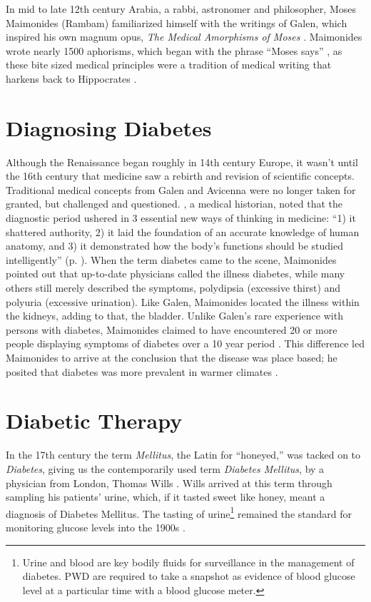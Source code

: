 \documentclass[12pt]{article}
\begin{document}
In mid to late 12th century Arabia, a rabbi, astronomer and philosopher, Moses Maimonides (Rambam) familiarized himself with the writings of Galen, which inspired his own magnum opus, \textit{The Medical Amorphisms of Moses} \citep{maimonides_1989_medical}. Maimonides wrote nearly 1500 aphorisms, which began with the phrase ``Moses says'' \citep{maimonides_1989_medical}, as these bite sized medical principles were a tradition of medical writing that harkens back to Hippocrates \citep{sanders_2001_philatelic}.

\section{Diagnosing Diabetes} 

Although the Renaissance began roughly in 14th century Europe, it wasn't until the 16th century that medicine saw a rebirth and revision of scientific concepts. Traditional medical concepts from Galen and Avicenna were no longer taken for granted, but challenged and questioned. \citet{osler_1921_evolution}, a medical historian, noted that the diagnostic period ushered in 3 essential new ways of thinking in medicine: ``1) it shattered authority, 2) it laid the foundation of an accurate knowledge of human anatomy, and 3) it demonstrated how the body's functions should be studied intelligently'' (p.  ). 
 When the term diabetes came to the scene, Maimonides pointed out that up-to-date physicians called the illness diabetes, while many others still merely described the symptoms, polydipsia (excessive thirst) and polyuria (excessive urination). Like Galen, Maimonides located the illness within the kidneys, adding to that, the bladder.  Unlike Galen's rare experience with persons with diabetes, Maimonides claimed to have encountered 20 or more people displaying symptoms of diabetes over a 10 year period \citep{maimonides_1989_medical}. This difference led Maimonides to arrive at the conclusion that the disease was place based; he posited that diabetes was more prevalent in warmer climates \citep{maimonides_1989_medical}.

\section{Diabetic Therapy}
In the 17th century the term \textit{Mellitus}, the Latin for ``honeyed,'' was tacked on to \textit{Diabetes}, giving us the contemporarily used term \textit{Diabetes Mellitus}, by a physician from London, Thomas Wills \citep{sattley_history_1996}. Wills arrived at this term through sampling his patients' urine, which, if it tasted sweet like honey, meant a diagnosis of Diabetes Mellitus. The tasting of urine\footnote{Urine and blood are key bodily fluids for surveillance in the management of diabetes. PWD are required to take a snapshot as evidence of blood glucose level at a particular time with a blood glucose meter.} remained the standard for monitoring glucose levels into the 1900s \citep{sattley_history_1996}. 
\end{document}
